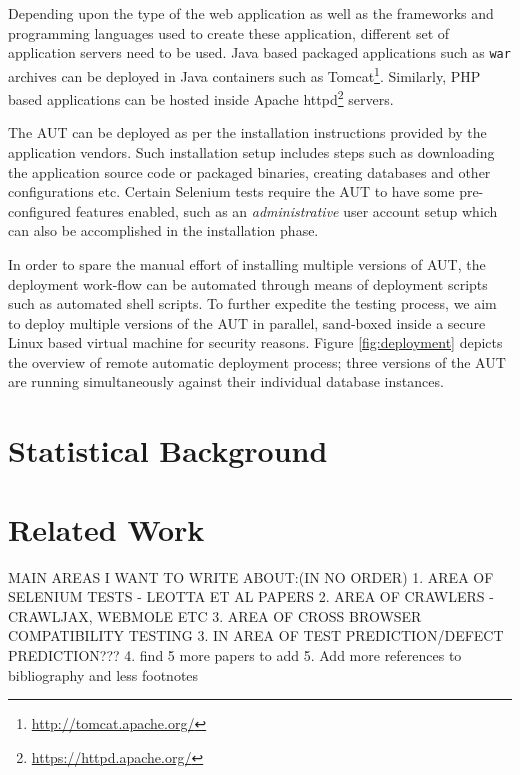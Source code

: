 Depending upon the type of the web application as well as the frameworks and programming languages used to create these application, different set of application servers need to be used. Java based packaged applications such as \texttt{war} archives can be deployed in Java containers such as Tomcat\footnote{\url{http://tomcat.apache.org/}}. Similarly, PHP based applications can be hosted inside Apache httpd\footnote{\url{https://httpd.apache.org/}} servers. 

The AUT can be deployed as per the installation instructions provided by the application vendors. Such installation setup includes steps such as downloading the application source code or packaged binaries, creating databases and other configurations etc. Certain Selenium tests require the AUT to have some pre-configured features enabled, such as an \textit{administrative} user account setup which can also be accomplished in the installation phase. 

In order to spare the manual effort of installing multiple versions of AUT, the deployment work-flow can be automated through means of deployment scripts such as automated shell scripts. To further expedite the testing process, we aim to deploy multiple versions of the AUT in parallel, sand-boxed inside a secure Linux based virtual machine for security reasons. Figure \ref{fig:deployment} depicts the overview of remote automatic deployment process; three versions of the AUT are running simultaneously against their individual database instances.


\section{Statistical Background}
\label{sec:Statistical}

\section{Related Work}
\label{sec:relatedWork}
MAIN AREAS I WANT TO WRITE ABOUT:(IN NO ORDER)
1. AREA OF SELENIUM TESTS - LEOTTA ET AL PAPERS
2. AREA OF CRAWLERS - CRAWLJAX, WEBMOLE ETC
3. AREA OF CROSS BROWSER COMPATIBILITY TESTING
3. IN AREA OF TEST PREDICTION/DEFECT PREDICTION???
4. find 5 more papers to add
5. Add more references to bibliography and less footnotes

